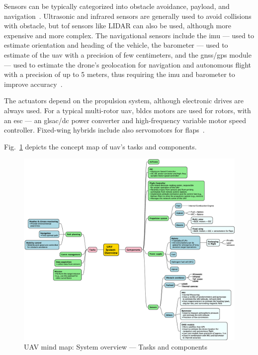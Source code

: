 Sensors can be typically categorized into obstacle avoidance, payload, and
navigation~\cite{VogeltanzFreeSWUAVSurvey2016}. Ultrasonic and infrared sensors are generally used to avoid
collisions with obstacle, but \gls{tof} sensors like LIDAR can also be used,
although more expensive and more complex. The navigational sensors include the
\gls{imu} --- used to estimate orientation and heading of the vehicle, the
barometer --- used to estimate of the \gls{uav} with a precision of few
centimeters, and the \gls{gnss}/\gls{gps} module --- used to estimate the
drone's geolocation for navigation and autonomous flight with a precision of up
to 5 meters, thus requiring the \gls{imu} and barometer to improve accuracy~\cite{ebeidUAVPlatformsSurvey2017}.

The actuators depend on the propulsion system, although electronic drives are
always used. For a typical multi-rotor \gls{uav}, \glspl{bldc} motors are used
for rotors, with an \gls{esc} --- an gls{ac}/\gls{dc} power converter and
high-frequency variable motor speed controller. Fixed-wing hybrids include also
servomotors for flaps~\cite{gabrielBLDCFixedWingUAV2011}.

Fig.~\ref{fig:uav-sysOverv-tasks-mindmap} depicts the concept map of \gls{uav}'s
tasks and components.

\begin{figure}[!hbt]
  \centering
  \includegraphics[width=1.0\textwidth]{./img/eps/uav2-1-mindmap.eps} 
%   
  \caption{UAV mind map: System overview --- Tasks and components}%
  \label{fig:uav-sysOverv-tasks-mindmap}
\end{figure}


